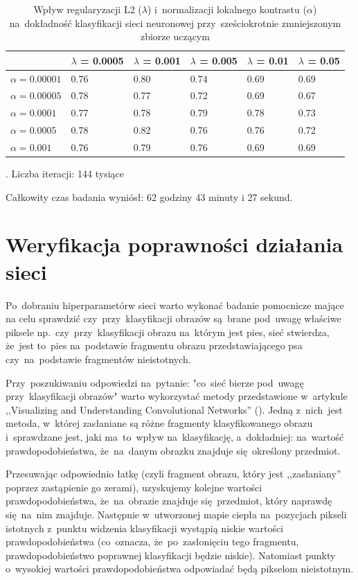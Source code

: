 \begin{table}[H]
    \centering
    \begin{tabular}{|l|l|l|l|l|l|}
      \hline
                       & $\lambda$ = 0.0005 & $\lambda$ = 0.001 & $\lambda$ = 0.005 & $\lambda$ = 0.01 & $\lambda$ = 0.05 \\
      \hline
      $\alpha=0.00001$ & 0.76 & 0.80 & 0.74 & 0.69 & 0.69 \\
      \hline
      $\alpha=0.00005$ & 0.78 & 0.77 & 0.72 & 0.69 & 0.67 \\
      \hline
      $\alpha=0.0001$  & 0.77 & 0.78 & 0.79 & 0.78 & 0.73 \\
      \hline
      $\alpha=0.0005$  & 0.78 & 0.82 & 0.76 & 0.76 & 0.72 \\
      \hline
      $\alpha=0.001$   & 0.76 & 0.79 & 0.76 & 0.69 & 0.69 \\
      \hline
    \end{tabular}

    \caption{Wpływ regularyzacji L2 ($\lambda$) i~normalizacji lokalnego kontrastu ($\alpha$) na~dokładność klasyfikacji
    sieci neuronowej przy~sześciokrotnie zmniejszonym zbiorze uczącym}. Liczba iteracji: 144 tysiące
    \label{table:wyniki3}
\end{table}

Całkowity czas badania wyniósł: 62 godziny 43 minuty i 27 sekund.

\section{Weryfikacja poprawności działania sieci} \label{sec:weryfikacja-poprawnosci}
Po~dobraniu hiperparametórw sieci warto wykonać badanie pomocnicze mające na celu sprawdzić czy~przy~klasyfikacji
obrazów są~brane pod~uwagę właściwe piksele np.~czy~przy~klasyfikacji obrazu na~którym jest pies, sieć stwierdza,
że~jest to~pies na~podstawie fragmentu obrazu przedstawiającego psa czy~na~podstawie fragmentów nieistotnych.

Przy~poszukiwaniu odpowiedzi na~pytanie: "co~sieć bierze pod~uwagę przy~klasyfikacji obrazów" warto wykorzystać
metody przedstawione w~artykule ,,Visualizing and Understanding Convolutional Networks'' (\cite{understanding-cnn}).
Jedną z~nich~jest metoda, w~której zasłaniane są różne fragmenty klasyfikowanego obrazu i~sprawdzane jest,
jaki ma~to~wpływ na~klasyfikację, a~dokładniej: na~wartość prawdopodobieństwa, że~na~danym obrazku znajduje
się~określony przedmiot.

Przesuwając odpowiednio łatkę (czyli fragment obrazu, który jest ,,zasłaniany'' poprzez zastąpienie go zerami),
uzyskujemy kolejne wartości prawdopodobieństwa, że~na~obrazie znajduje się~przedmiot, który naprawdę się~na~nim
znajduje. Następnie w~utworzonej mapie ciepła na~pozycjach pikseli istotnych z~punktu widzenia klasyfikacji wystąpią
niskie wartości prawdopodobieństwa (co~oznacza, że~po~zasłonięciu tego fragmentu, prawdopodobieństwo poprawnej
klasyfikacji będzie niskie). Natomiast punkty o~wysokiej wartości prawdopodobieństwa odpowiadać będą pikselom
nieistotnym.

